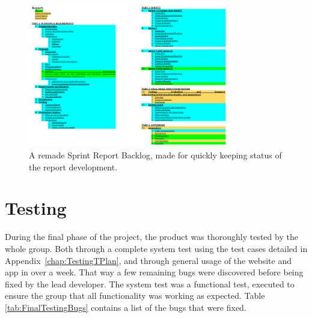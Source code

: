 \begin{figure}[ht!]
\centering
\includegraphics[width=90mm]{./FinalSprint/img/ReportBacklog.png}
\caption{A remade Sprint Report Backlog, made for quickly keeping status of the report development. \label{fig:FinalReportBacklog}}
\end{figure}

\section{Testing}
\label{sec:FinalTesting}

During the final phase of the project, the product was thoroughly tested by the whole group. Both through a complete system test using the test cases detailed in Appendix~\ref{chap:TestingTPlan}, and through general usage of the website and app in over a week. That way a few remaining bugs were discovered before being fixed by the lead developer. The system test was a functional test, executed to ensure the group that all functionality was working as expected. Table \ref{tab:FinalTestingBugs} contains a list of the bugs that were fixed.

